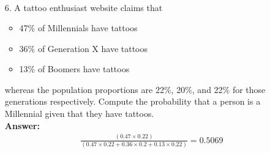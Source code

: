 \documentclass[a4paper]{article}
\begin{document}
\begin{itemize}
\begin{equation}
\begin{split}
        \end{split}
    \end{equation}
	\item[6.] A tattoo enthusiast website claims that \\
	      \begin{itemize}
	      	\item 47\% of Millennials have tattoos
	      	\item 36\% of Generation X have tattoos
	      	\item 13\% of Boomers have tattoos
	      \end{itemize} 
          whereas the population proportions are 22\%, 20\%, and 22\% for those generations respectively. Compute the probability that a person is a Millennial given that they have tattoos. \\
          \textbf{Answer:} 
          \begin{equation}
            \begin{split}
                \frac{(0.47 \times 0.22)}{(0.47 \times 0.22 + 0.36 \times 0.2 + 0.13 \times 0.22)} = 0.5069
            \end{split}
        \end{equation}
\end{itemize}
\end{document}
